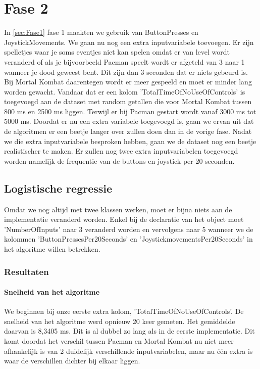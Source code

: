 
\newpage
\section{Fase 2}
\label{sec:Fase2}

In \ref{sec:Fase1} fase 1 maakten we gebruik van ButtonPresses en JoystickMovements. We gaan nu nog een extra inputvariabele toevoegen. Er zijn spelletjes waar je soms eventjes niet kan spelen omdat er van level wordt veranderd of als je bijvoorbeeld Pacman speelt wordt er afgeteld van 3 naar 1 wanneer je dood geweest bent. Dit zijn dan 3 seconden dat er niets gebeurd is. Bij Mortal Kombat daarentegen wordt er meer gespeeld en moet er minder lang worden gewacht.
Vandaar dat er een kolom 'TotalTimeOfNoUseOfControls' is toegevoegd aan de dataset met random getallen die voor Mortal Kombat tussen 800 ms en 2500 ms liggen. Terwijl er bij Pacman gestart wordt vanaf 3000 ms tot 5000 ms.
Doordat er nu een extra variabele toegevoegd is, gaan we ervan uit dat de algoritmen er een beetje langer over zullen doen dan in de vorige fase. Nadat we die extra inputvariabele besproken hebben, gaan we de dataset nog een beetje realistischer te maken. Er zullen nog twee extra inputvariabelen toegevoegd worden namelijk de frequentie van de buttons en joystick per 20 seconden.  

\subsection{Logistische regressie}
\label{sec:Logistischeregressie-fase2}

Omdat we nog altijd met twee klassen werken, moet er bijna niets aan de implementatie veranderd worden. Enkel bij de declaratie van het object moet 'NumberOfInputs' naar 3 veranderd worden en vervolgens naar 5 wanneer we de kolommen 'ButtonPressesPer20Seconds' en 'JoystickmovementsPer20Seconds' in het algoritme willen betrekken. 

\subsubsection{Resultaten}
\paragraph{Snelheid van het algoritme} 
We beginnen bij onze eerste extra kolom, 'TotalTimeOfNoUseOfControls'. De snelheid van het algoritme werd opnieuw 20 keer gemeten. Het gemiddelde daarvan is 8,3405 ms. Dit is al dubbel zo lang als in de eerste implementatie. Dit komt doordat het verschil tussen Pacman en Mortal Kombat nu niet meer afhankelijk is van 2 duidelijk verschillende inputvariabelen, maar nu één extra is waar de verschillen dichter bij elkaar liggen.


